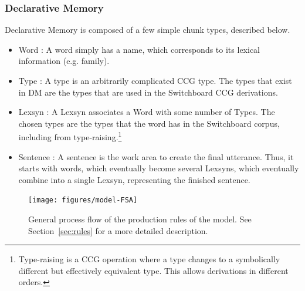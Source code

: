 \subsubsection{Declarative Memory}\label{sec:dm}
Declarative Memory is composed of a few simple chunk types, described below.
\begin{itemize}
\item Word : A word simply has a name, which corresponds to its lexical information (e.g. family).
\item Type : A type is an arbitrarily complicated CCG type. The types that exist in DM are the types that are used in the Switchboard CCG derivations.
\item Lexsyn : A Lexsyn associates a Word with some number of Types. The chosen types are the types that the word has in the Switchboard corpus, including from type-raising.\footnote{Type-raising is a CCG operation where a type changes to a symbolically different but effectively equivalent type. This allows derivations in different orders.}
\item Sentence : A sentence is the work area to create the final utterance. Thus, it starts with words, which eventually become several Lexsyns, which eventually combine into a single Lexsyn, representing the finished sentence.
\end{itemize}

\begin{figure}[ht]
\begin{center}
\texttt{[image: figures/model-FSA]}
\end{center}
\caption{General process flow of the production rules of the model. See Section~\ref{sec:rules} for a more detailed description.}  
\label{fig:prod}
\end{figure}

